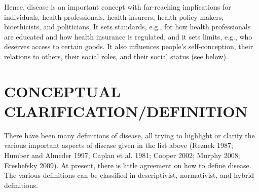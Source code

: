 \documentclass[conference]{IEEEtran}
\begin{document}
Hence, disease is an important concept with far-reaching implications for individuals, health professionals, health insurers, health policy makers, bioethicists, and politicians. It sets standards, e.g., for how health professionals are educated and how health insurance is regulated, and it sets limits, e.g., who deserves access to certain goods. It also inﬂuences people’s self-conception, their relations to others, their social roles, and their social status (see below).

\section{CONCEPTUAL CLARIFICATION/DEFINITION}

There have been many deﬁnitions of disease, all trying to highlight or clarify the various important aspects of disease given in the list above (Reznek 1987; Humber and Almeder 1997; Caplan et al. 1981; Cooper 2002; Murphy 2008; Ereshefsky 2009). At present, there is little agreement on how to deﬁne disease. The various deﬁnitions can be classiﬁed in descriptivist, normativist, and hybrid deﬁnitions.
\end{document}
